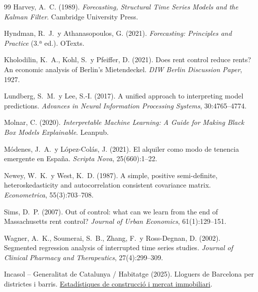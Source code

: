 \documentclass[10pt,a4paper,twocolumn]{article}
\begin{document}
\begin{thebibliography}{99}
Harvey, A.~C. (1989).
\textit{Forecasting, Structural Time Series Models and the Kalman Filter}.
Cambridge University Press.

Hyndman, R.~J.\ y Athanasopoulos, G. (2021).
\textit{Forecasting: Principles and Practice} (3.ª ed.).
OTexts.

Kholodilin, K.~A., Kohl, S.\ y Pfeiffer, D. (2021).
Does rent control reduce rents? An economic analysis of Berlin's Mietendeckel.
\textit{DIW Berlin Discussion Paper}, 1927.

Lundberg, S.~M.\ y Lee, S.-I. (2017).
A unified approach to interpreting model predictions.
\textit{Advances in Neural Information Processing Systems}, 30:4765--4774.

Molnar, C. (2020).
\textit{Interpretable Machine Learning: A Guide for Making Black Box Models Explainable}.
Leanpub.

Módenes, J.~A.\ y López-Colás, J. (2021).
El alquiler como modo de tenencia emergente en España.
\textit{Scripta Nova}, 25(660):1--22.

Newey, W.~K.\ y West, K.~D. (1987).
A simple, positive semi-definite, heteroskedasticity and autocorrelation
consistent covariance matrix.
\textit{Econometrica}, 55(3):703--708.

Sims, D.~P. (2007).
Out of control: what can we learn from the end of Massachusetts rent control?
\textit{Journal of Urban Economics}, 61(1):129--151.

Wagner, A.~K., Soumerai, S.~B., Zhang, F.\ y Ross-Degnan, D. (2002).
Segmented regression analysis of interrupted time series studies.
\textit{Journal of Clinical Pharmacy and Therapeutics}, 27(4):299--309.

{Incasol -- Generalitat de Catalunya / Habitatge} (2025).
Lloguers de Barcelona per districtes i barris.
\href{https://habitatge.gencat.cat/ca/dades/indicadors_estadistiques/estadistiques_de_construccio_i_mercat_immobiliari/mercat_de_lloguer/lloguers-barcelona-per-districtes-i-barris/}{Estadístiques de construcció i mercat immobiliari}.


\end{thebibliography}
\end{document}
